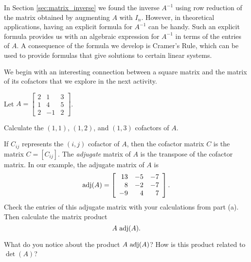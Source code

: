 
In Section \ref{sec:matrix_inverse} we found the inverse $A^{-1}$ using row reduction of the matrix obtained by augmenting $A$ with $I_n$. However, in theoretical applications, having an explicit formula for $A^{-1}$ can be handy. Such an explicit formula provides us with an algebraic expression for $A^{-1}$ in terms of the entries of $A$. A consequence of the formula we develop is Cramer's Rule, which can be used to provide formulas that give solutions to certain linear systems.

We begin with an interesting connection between a square matrix and the matrix of its cofactors that we explore in the next activity.



\begin{activity} \label{act:4_f_4} Let $A = \left[ \begin{array}{crc} 2&1&3 \\ 1&4&5 \\ 2&-1&2 \end{array} \right]$. 
\ba
\item Calculate the $(1,1)$, $(1,2)$, and $(1,3)$ cofactors of $A$.



\item If $C_{ij}$ represents the $(i,j)$ cofactor of $A$, then the cofactor matrix $C$ is the matrix $C = [C_{ij}]$. The \emph{adjugate} matrix of $A$ is the transpose of the cofactor matrix. In our example, the adjugate matrix of $A$ is 
\[\text{adj}(A) = \left[ \begin{array}{rrr} 13&-5&-7 \\ 8&-2&-7 \\ -9&4&7 \end{array} \right].\]
Check the entries of this adjugate matrix with your calculations from part (a). Then calculate the matrix product
\[A \ \text{adj}(A).\]



\item What do you notice about the product $A \ \adj(A)$? How is this product related to $\det(A)$?



\ea

\end{activity}



